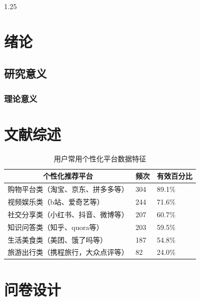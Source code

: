 \documentclass[12pt,UTF8]{ctexart}
\begin{document}
\begin{spacing}{1.25}
\section{绪论}
\subsection{研究意义}
\subsubsection{理论意义}
\setcounter{table}{0}
\setcounter{figure}{0}
\zhlipsum[1]


\newpage
\section{文献综述}
\setcounter{table}{0}
\setcounter{figure}{0}
\zhlipsum[1-2]
\begin{table}[htbp]
	\centering
	\caption{用户常用个性化平台数据特征}
	\label{tab:gxhpt}
	\begin{tabular}{@{}lll@{}}
		\toprule
		\multicolumn{1}{c}{\textbf{个性化推荐平台}} & \multicolumn{1}{c}{\textbf{频次}} & \multicolumn{1}{c}{\textbf{有效百分比}} \\ \midrule
		购物平台类（淘宝、京东、拼多多等）                    & 304                             & 89.1\%                             \\
		视频娱乐类（b站、爱奇艺等）                      & 244                             & 71.6\%                             \\
		社交分享类（小红书、抖音、微博等）                    & 207                             & 60.7\%                             \\
		知识问答类（知乎、quora等）                     & 203                             & 59.5\%                             \\
		生活美食类（美团、饿了吗等）                       & 187                             & 54.8\%                             \\
		旅游出行类（携程旅行，大众点评等）                    & 82                              & 24.0\%                             \\ \bottomrule
	\end{tabular}
\end{table}




\newpage
\section{问卷设计}

\end{spacing}
\end{document}
